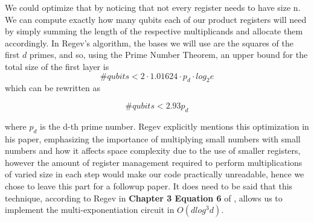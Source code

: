 We could optimize that by noticing that not every register needs to have size n. We can compute exactly how many qubits each of our product registers will need by simply summing the length of the respective multiplicands and allocate them accordingly. In Regev's algorithm, the bases we will use are the squares of the first $d$ primes, and so, using the Prime Number Theorem, an upper bound for the total size of the first layer is $$\# qubits < 2\cdot 1.01624\cdot p_d \cdot log_2{e}$$ which can be rewritten as

\begin{equation}
    \# qubits < 2.93p_d
\end{equation}

where $p_d$ is the d-th prime number. Regev explicitly mentions this optimization in his paper, emphasizing the importance of multiplying small numbers with small numbers and how it affects space complexity due to the use of smaller registers, however the amount of register management required to perform multiplications of varied size in each step would make our code practically unreadable, hence we chose to leave this part for a followup paper. It does need to be said that this technique, according to Regev in \textbf{Chapter 3 Equation 6} of \cite{Regev2025}, allows us to implement the multi-exponentiation circuit in $O(dlog^3d)$.





